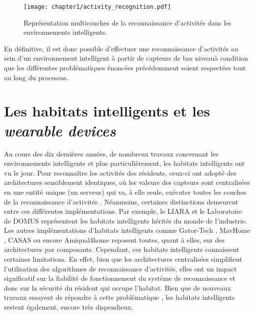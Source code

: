 {{\begin{figure}[H]
	\centering
	\texttt{[image: chapter1/activity\_recognition.pdf]}
	\caption{Représentation multicouches de la reconnaissance d'activités dans les environnements intelligents.}
	\label{fig:activity_recognition}
\end{figure}

En définitive, il est donc possible d'effectuer une reconnaissance d'activités au sein d'un environnement intelligent à partir de capteurs de bas niveau\textemdash à condition que les différentes problématiques énoncées précédemment soient respectées tout au long du processus.

\section{Les habitats intelligents et les \textit{wearable devices}}

Au cours des dix dernières années, de nombreux travaux concernant les environnements intelligents et plus particulièrement, les habitats intelligents ont vu le jour. Pour reconnaître les activités des résidents, ceux-ci ont adopté des architectures sensiblement identiques, où les valeurs des capteurs sont centralisées en une entité unique (un serveur) qui va, à elle seule, exécuter toutes les couches de la reconnaissance d’activités \citep{Bouchard2014, Hu2016}. Néanmoins, certaines distinctions demeurent entre ces différentes implémentations. Par exemple, le \ac{LIARA} \citep{Bouchard2014} et le Laboratoire de \ac{DOMUS} \citep{Giroux2009} représentent les habitats intelligents hérités du monde de l’industrie. Les autres implémentations d'habitats intelligents comme Gator-Tech \citep{Helal2005}, MavHome \citep{DJCook2003}, CASAS \citep{Cook2013} ou encore Amiqual4home \citep{Lago2017} reposent toutes, quant à elles, sur des architectures par composants. Cependant, ces habitats intelligents connaissent certaines limitations. En effet, bien que les architectures centralisées simplifient l'utilisation des algorithmes de reconnaissance d'activités, elles ont un impact significatif sur la fiabilité de fonctionnement du système de reconnaissance et donc sur la sécurité du résident qui occupe l'habitat. Bien que de nouveaux travaux essayent de répondre à cette problématique \citep{Cook2013, Plantevin2018}, les habitats intelligents restent également, encore très dispendieux.

}}
